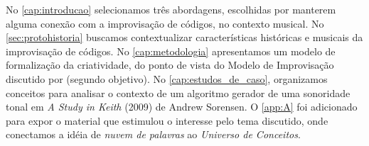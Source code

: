 No \autoref{cap:introducao} selecionamos três abordagens, escolhidas por manterem alguma conexão com a improvisação de códigos, no contexto musical.  No \autoref{sec:protohistoria} buscamos contextualizar características históricas e musicais da improvisação de códigos. No \autoref{cap:metodologia} apresentamos um modelo de formalização da criatividade, do ponto de vista do Modelo de Improvisação discutido por  (segundo objetivo). No \autoref{cap:estudos_de_caso}, organizamos conceitos para analisar o contexto de um algoritmo gerador de uma sonoridade tonal em \emph{A Study in Keith} (2009) de Andrew Sorensen.  O \autoref{app:A} foi adicionado para expor o material que estimulou o interesse pelo tema discutido, onde conectamos a idéia de \emph{nuvem de palavras} ao \emph{Universo de Conceitos}.%